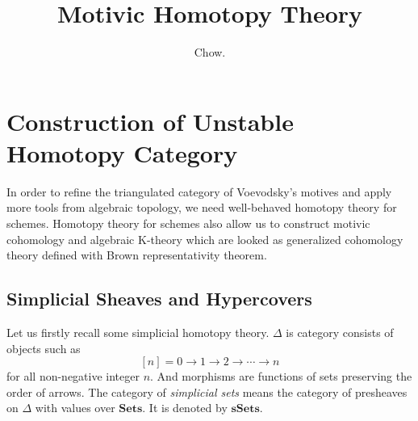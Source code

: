 \documentclass[a4paper,11pt]{article}
\title{Motivic Homotopy Theory}
\author{Chow.}
\begin{document}
\maketitle
	\section{Construction of Unstable Homotopy Category}
	In order to refine the triangulated category of Voevodsky's motives and apply more tools from algebraic topology, we need well-behaved homotopy theory for schemes. Homotopy theory for schemes also allow us to construct motivic cohomology and algebraic K-theory which are looked as generalized cohomology theory defined with Brown representativity theorem.
	\subsection{Simplicial Sheaves and Hypercovers}
	Let us firstly recall some simplicial homotopy theory.
	$\Delta$ is category consists of objects such as
	\[
	[n]={0 \to 1 \to 2 \to \cdots \to n}
	\]
	for all non-negative integer $n$. And morphisms are functions of sets preserving the order of arrows.
	The category of \emph{simplicial sets} means the category of presheaves on $\Delta$ with values over $\mathbf{Sets}$. It is denoted by $\mathbf{sSets}$.
	
\end{document}
